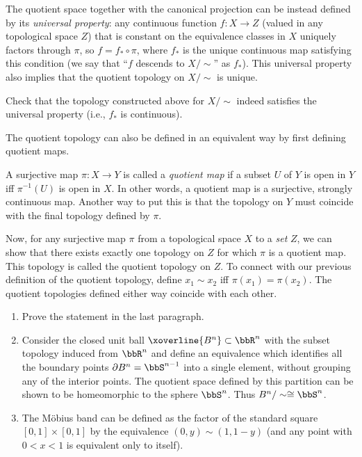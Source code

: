The quotient space together with the canonical projection can be instead defined by its \emph{universal property}: any continuous function $f:X\to Z$ (valued in any topological space $Z$) that is constant on the equivalence classes in $X$ uniquely factors through  $\pi$, so $f=f_\ast\circ\pi$, where $f_\ast$ is the unique continuous map satisfying this condition (we say that ``$f$ descends to $X/\sim$'' as $f_\ast$). This universal property also implies that the quotient topology on $X\slash\sim$ is unique.

\begin{xca}
Check that the topology constructed above for $X/\sim$ indeed satisfies the universal property (i.e., $f_\ast$ is continuous).
\end{xca}

The quotient topology can also be defined in an equivalent way by first defining quotient maps.
\begin{defn}
A surjective map $\pi:X\rightarrow Y$ is called a \emph{quotient map} if a subset $U$ of $Y$ is open in $Y$ iff $\pi^{-1}(U)$ is open in $X$. In other words, a quotient map is a surjective, strongly continuous map. Another way to put this is that the topology on $Y$ must coincide with the final topology defined by $\pi$.
\end{defn}

Now, for any surjective map $\pi$ from a topological space $X$ to a \emph{set} $Z$, we can show that there exists exactly one topology on $Z$ for which $\pi$ is a quotient map. This topology is called the quotient topology on $Z$. To connect with our previous definition of the quotient topology, define $x_1\sim x_2$ iff $\pi(x_1)=\pi(x_2)$. The quotient topologies defined either way coincide with each other.

\begin{example}
\begin{enumerate}
    \item Prove the statement in the last paragraph.
    \item Consider the closed unit ball $\xoverline{B^n}\subset\bbR^n$ with the subset topology induced from $\bbR^n$ and define an equivalence which identifies all the boundary points $\partial B^n = \bbS^{n-1}$ into a single element, without grouping any of the interior points. The quotient space defined by this partition can be shown to be homeomorphic to the sphere $\bbS^n$. Thus $B^n/\sim \cong \bbS^n$.
    \item The M\"obius band can be defined as the factor of the standard square $[0,1]\times[0,1]$ by the equivalence $(0,y)\sim (1,1-y)$ (and any point with $0<x<1$ is equivalent only to itself).
\end{enumerate}
\end{example}


